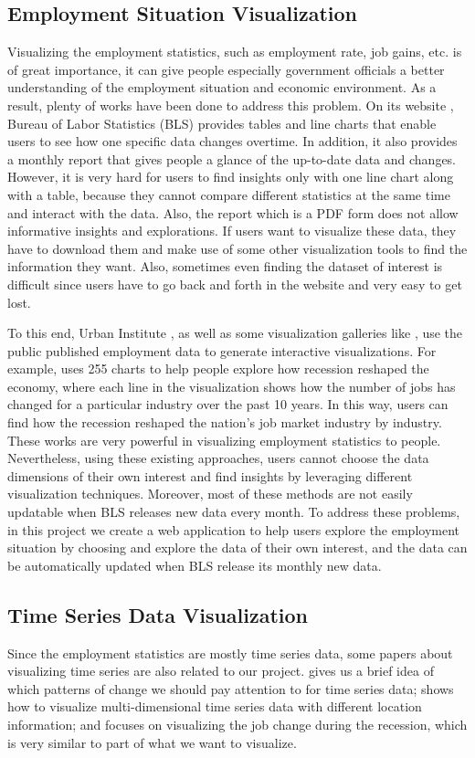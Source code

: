 \documentclass{sigchi}
\begin{document}
\subsection{Employment Situation Visualization}
Visualizing the employment statistics, such as employment rate, job gains, etc. is of great importance, it can give people especially government officials a better understanding of the employment situation and economic environment. As a result, plenty of works have been done to address this problem. On its website \cite{Labor_data}, Bureau of Labor Statistics (BLS) provides tables and line charts that enable users to see how one specific data changes overtime. In addition, it also provides a monthly report that gives people a glance of the up-to-date data and changes. However, it is very hard for users to find insights only with one line chart along with a table, because they cannot compare different statistics at the same time and interact with the data. Also, the report which is a PDF form does not allow informative insights and explorations. If users want to visualize these data, they have to download them and make use of some other visualization tools to find the information they want. Also, sometimes even finding the dataset of interest is difficult since users have to go back and forth in the website and very easy to get lost.

To this end, Urban Institute \cite{urban_website}, as well as some visualization galleries like \cite{David2014, Jeremy2014,Tableau}, use the public published employment data to generate interactive visualizations. For example, \cite{Jeremy2014} uses 255 charts to help people explore how recession reshaped the economy, where each line in the visualization shows how the number of jobs has changed for a particular industry over the past 10 years. In this way, users can find how the recession reshaped the nation’s job market industry by industry. These works are very powerful in visualizing employment statistics to people. Nevertheless, using these existing approaches, users cannot choose the data dimensions of their own interest and find insights by leveraging different visualization techniques. Moreover, most of these methods are not easily updatable when BLS releases new data every month. To address these problems, in this project we create a web application to help users explore the employment situation by choosing and explore the data of their own interest, and the data can be automatically updated when BLS release its monthly new data.


\subsection{Time Series Data Visualization}
Since the employment statistics are mostly time series data, some papers \cite{Few2007,Roger2008,Jeremy2014} about visualizing time series are also related to our project. \cite{Few2007}  gives us a brief idea of which patterns of change we should pay attention to for time series data; \cite{Roger2008} shows how to visualize multi-dimensional time series data with different location information; and \cite{Jeremy2014} focuses on visualizing the job change during the recession, which is very similar to part of what we want to visualize.
\end{document}
